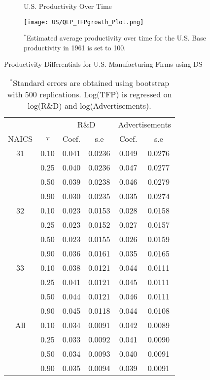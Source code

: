 \documentclass[12pt]{article}
\begin{document}
\begin{appendices}
\begin{figure}[H]
\centering
\caption{U.S. Productivity Over Time}
\texttt{[image: US/QLP\_TFPgrowth\_Plot.png]}
\caption*{\footnotesize $^{*}$Estimated average productivity over time for the U.S. Base productivity in 1961 is set to 100.}
\label{fig:QLPUSTFPG}
\end{figure}

\begin{table}[H]
\centering
\caption{Productivity Differentials for U.S. Manufacturing Firms using DS}
\small
\begin{tabular}{cccccc}
  \hline\hline & & \multicolumn{2}{c}{R\&D}  & \multicolumn{2}{c}{Advertisements} \\ \cmidrule(lr){3-4} \cmidrule(lr){5-6}NAICS & $\tau$ & Coef. & s.e & Coef. & s.e \\ 
  \hline
31 & 0.10 & 0.041 & 0.0236 & 0.049 & 0.0276 \\ 
   & 0.25 & 0.040 & 0.0236 & 0.047 & 0.0277 \\ 
   & 0.50 & 0.039 & 0.0238 & 0.046 & 0.0279 \\ 
   & 0.90 & 0.030 & 0.0235 & 0.035 & 0.0274 \\ 
  32 & 0.10 & 0.023 & 0.0153 & 0.028 & 0.0158 \\ 
   & 0.25 & 0.023 & 0.0152 & 0.027 & 0.0157 \\ 
   & 0.50 & 0.023 & 0.0155 & 0.026 & 0.0159 \\ 
   & 0.90 & 0.036 & 0.0161 & 0.035 & 0.0165 \\ 
  33 & 0.10 & 0.038 & 0.0121 & 0.044 & 0.0111 \\ 
   & 0.25 & 0.041 & 0.0121 & 0.045 & 0.0111 \\ 
   & 0.50 & 0.044 & 0.0121 & 0.046 & 0.0111 \\ 
   & 0.90 & 0.045 & 0.0118 & 0.044 & 0.0108 \\ 
  All & 0.10 & 0.034 & 0.0091 & 0.042 & 0.0089 \\ 
   & 0.25 & 0.033 & 0.0092 & 0.041 & 0.0090 \\ 
   & 0.50 & 0.034 & 0.0093 & 0.040 & 0.0091 \\ 
   & 0.90 & 0.035 & 0.0094 & 0.039 & 0.0091 \\ 
   \hline
\end{tabular}
\caption*{\footnotesize $^{*}$Standard errors are obtained using bootstrap with 500 replications. Log(TFP) is regressed on log(R\&D) and log(Advertisements).}
\label{QLPUSTFPP}
\end{table}


\end{appendices}
\end{document}
